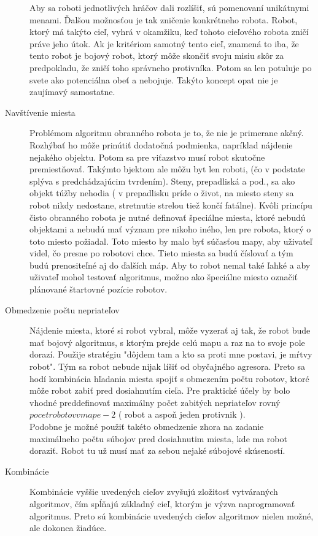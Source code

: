 \begin{description}
Aby sa roboti jednotlivých hráčov dali rozlíšiť, sú pomenovaní unikátnymi menami. Ďalšou možnosťou je tak zničenie konkrétneho robota. Robot, ktorý má takýto cieľ, vyhrá v okamžiku, keď tohoto cieľového robota zničí práve jeho útok. Ak je kritériom samotný tento cieľ, znamená to iba, že tento robot je bojový robot, ktorý môže skončiť svoju misiu skôr za predpokladu, že zničí toho správneho protivníka. Potom sa len potuluje po svete ako potenciálna obeť a nebojuje. Takýto koncept opat nie je zaujímavý samostatne.
\item [Navštívenie miesta]
Problémom algoritmu obranného robota je to, že nie je primerane akčný. Rozhýbať ho môže prinútiť dodatočná podmienka, napríklad nájdenie nejakého objektu. Potom sa pre viťazstvo musí robot skutočne premiestňovať. Takýmto bjektom ale môžu byt len roboti,  (čo v podstate splýva s predchádzajúcim tvrdením). Steny, prepadliská a pod., sa ako objekt túžby nehodia ( v prepadlisku príde o život, na miesto steny sa robot nikdy nedostane, stretnutie strelou tiež končí fatálne). Kvôli princípu čisto obranného robota je nutné definovať špeciálne miesta, ktoré nebudú objektami a nebudú mať význam pre nikoho iného, len pre robota, ktorý o toto miesto požiadal. Toto miesto by malo byť súčasťou mapy, aby uživateľ videl, čo presne po robotovi chce. Tieto miesta sa budú číslovať a tým budú prenositeľné aj do ďalších máp. Aby to robot nemal také ľahké a aby uživateľ mohol testovať algoritmus, možno ako špeciálne miesto označiť  plánované štartovné pozície robotov. \\
\item [Obmedzenie počtu nepriateľov] \hfill \newline
Nájdenie miesta, ktoré si robot vybral, môže vyzerať aj tak, že robot bude mať bojový algoritmus, s ktorým prejde celú mapu a raz na to svoje pole dorazí. Použije stratégiu  "dôjdem tam a kto sa proti mne postavi, je mŕtvy robot". Tým sa robot nebude nijak líšiť od obyčajného agresora. Preto sa hodí kombinácia hľadania miesta spojiť s obmezením počtu robotov, ktoré môže robot zabiť pred dosiahnutím cieľa. Pre praktické účely by bolo vhodné preddefinovať maximálny počet zabitých nepriateľov rovný $pocet robotov v mape - 2$ ( robot a aspoň jeden protivnik ). \\ %
Podobne je možné použiť takéto obmedzenie zhora na zadanie maximálneho počtu súbojov pred dosiahnutim miesta, kde ma robot doraziť. Robot tu už musí mať za sebou nejaké súbojové skúseností. %
\item [Kombinácie]
Kombinácie vyššie uvedených cieľov zvyšujú zložitosť vytváraných algoritmov, čím spĺňajú základný cieľ, ktorým je výzva naprogramovať algoritmus. Preto sú kombinácie uvedených cieľov algoritmov nielen možné, ale dokonca žiadúce.
\end{description}
